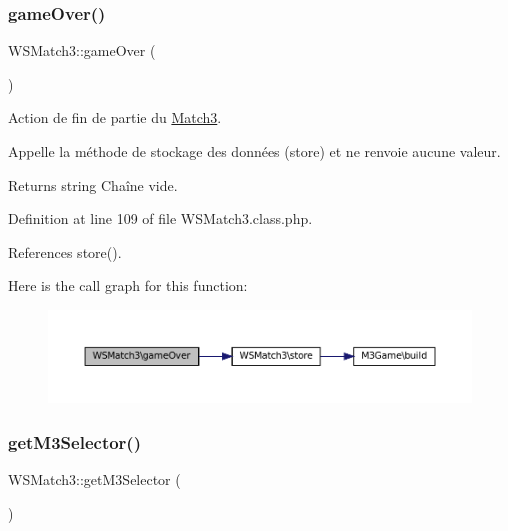 \subsubsection{\texorpdfstring{game\+Over()}{gameOver()}}
{\footnotesize\ttfamily W\+S\+Match3\+::game\+Over (\begin{DoxyParamCaption}{ }\end{DoxyParamCaption})\hspace{0.3cm}{\ttfamily [protected]}}

Action de fin de partie du \hyperlink{class_match3}{Match3}.

Appelle la méthode de stockage des données (store) et ne renvoie aucune valeur.

\begin{DoxyReturn}{Returns}
string Chaîne vide. 
\end{DoxyReturn}


Definition at line 109 of file W\+S\+Match3.\+class.\+php.



References store().

Here is the call graph for this function\+:\nopagebreak
\begin{figure}[H]
\begin{center}
\leavevmode
\includegraphics[width=350pt]{class_w_s_match3_a16d0c9ff94bf1349edc69fb58a8d0ff1_cgraph}
\end{center}
\end{figure}
\mbox{\label{class_w_s_match3_aa38859d7b938a1a463f5f71fa9158f18}} 
\subsubsection{\texorpdfstring{get\+M3\+Selector()}{getM3Selector()}}
{\footnotesize\ttfamily W\+S\+Match3\+::get\+M3\+Selector (\begin{DoxyParamCaption}{ }\end{DoxyParamCaption})\hspace{0.3cm}{\ttfamily [protected]}}

